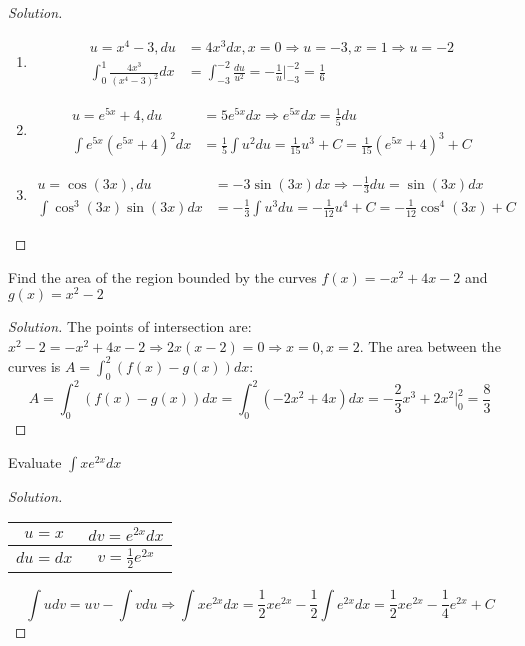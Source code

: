 \documentclass[crop=false,class=book]{standalone}
\begin{document}
\begin{proof}[Solution]
\
\begin{enumerate}
    \item   \begin{align*}
    u=x^{4}-3,du&=4x^{3}dx,x=0\Rightarrow u=-3,x=1\Rightarrow u=-2\\
    \int_{0}^{1}\frac{4x^{3}}{(x^{4}-3)^{2}}dx&=\int_{-3}^{-2}\frac{du}{u^{2}}=-\frac{1}{u}\big|_{-3}^{-2}=\frac{1}{6}
            \end{align*}
    \item   \begin{align*}
    u=e^{5x}+4,du&=5e^{5x}dx\Rightarrow e^{5x}dx=\frac{1}{5}du\\
    \int e^{5x}(e^{5x}+4)^{2}dx&=\frac{1}{5}\int u^{2}du=\frac{1}{15}u^{3}+C=\frac{1}{15}(e^{5x}+4)^{3}+C
            \end{align*}
    \item   \begin{align*}
    u=\cos(3x),du&=-3\sin(3x)dx\Rightarrow -\frac{1}{3}du=\sin(3x)dx\\
    \int \cos^{3}(3x)\sin(3x)dx&=-\frac{1}{3}\int u^{3}du=-\frac{1}{12}u^{4}+C=-\frac{1}{12}\cos^{4}(3x)+C
            \end{align*}
\end{enumerate}
\end{proof}
\begin{problem}
Find the area of the region bounded by the curves $f(x)=-x^{2}+4x-2$ and $g(x)=x^{2}-2$
\end{problem}
\begin{proof}[Solution]
The points of intersection are: $x^{2}-2=-x^{2}+4x-2\Rightarrow 2x(x-2)=0\Rightarrow x=0,x=2$.
The area between the curves is $A=\int_{0}^{2}(f(x)-g(x))dx$:
\begin{equation*}
    A=\int_{0}^{2}(f(x)-g(x))dx=\int_{0}^{2}(-2x^{2}+4x)dx=-\frac{2}{3}x^{3}+2x^{2}\big|_{0}^{2}=\frac{8}{3}
\end{equation*}
\end{proof}
\begin{problem}
Evaluate $\int xe^{2x}dx$
\end{problem}
\begin{proof}[Solution]
\
\begin{table}[H]
    \centering
    \begin{tabular}{|c|c|}
        \hline
        $u=x$&$dv=e^{2x}dx$\\
        \hline
        $du=dx$&$v=\frac{1}{2}e^{2x}$\\
        \hline
    \end{tabular}
\end{table}
\begin{equation*}
    \int udv=uv-\int vdu\Rightarrow \int xe^{2x}dx=\frac{1}{2}xe^{2x}-\frac{1}{2}\int e^{2x}dx=\frac{1}{2}xe^{2x}-\frac{1}{4}e^{2x}+C
\end{equation*}
\end{proof}
\end{document}
